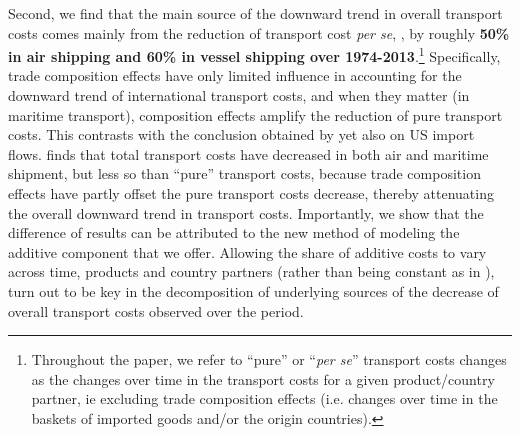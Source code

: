 \documentclass[a4paper,11pt]{article}
\begin{document}
Second, we find that the main source of the downward trend in overall transport costs comes mainly from the reduction of transport cost \textit{per se}, , by roughly \textbf{50\% in air shipping and 60\% in vessel shipping over 1974-2013}.\footnote{Throughout the paper, we refer to ``pure'' or ``\textit{per se}'' transport costs changes as the changes over time in the transport costs for a given product/country partner, ie excluding trade composition effects (i.e. changes over time in the baskets of imported goods and/or the origin countries).} Specifically, trade composition effects have only limited influence in accounting for the downward trend of international transport costs, and when they matter (in maritime transport), composition effects amplify the reduction of pure transport costs. This contrasts with the conclusion obtained by \cite{hummels2007} yet also on US import flows.%
\cite{hummels2007} finds that total transport costs have decreased in both air and maritime shipment, but less so than ``pure'' transport costs, because trade composition effects have partly offset the pure transport costs decrease, thereby attenuating the overall downward trend in transport costs. Importantly, we show that the difference of results can be attributed to the new method of modeling the additive component that we offer. Allowing the share of additive costs to vary across time, products and country partners (rather than being constant as in \citealp{hummels2007}), turn out to be key in the decomposition of underlying sources of the decrease of overall transport costs observed over the period.
\end{document}
